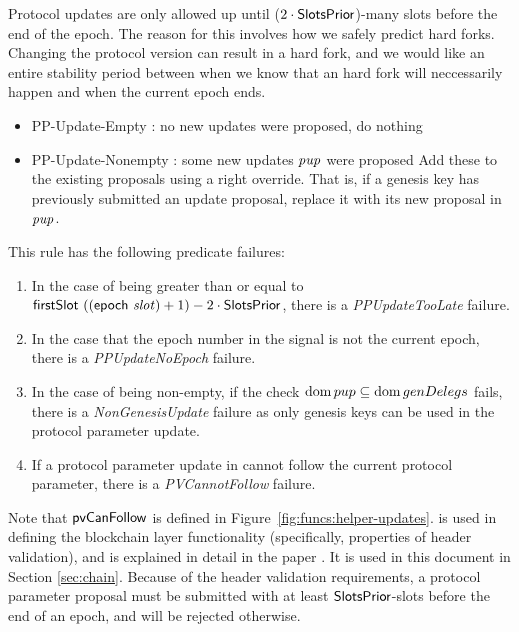 Protocol updates are only allowed up until ($2\cdot\mathsf{SlotsPrior}$)-many slots before the
end of the epoch. The reason for this involves how we safely predict hard forks.
Changing the protocol version can result in a hard fork, and we would like an
entire stability period between when we know that an hard fork will neccessarily happen
and when the current epoch ends.

\begin{itemize}
  \item PP-Update-Empty : no new updates were proposed, do nothing
  \item PP-Update-Nonempty : some new updates $\mathit{pup}$ were proposed
  Add these to
  the existing proposals using a right override. That is, if a genesis key
  has previously submitted an update proposal, replace it with its new
  proposal in $\mathit{pup}$.
\end{itemize}

This rule has the following predicate failures:

\begin{enumerate}
\item In the case of  being greater than or equal to
  $\mathsf{firstSlot}~((\mathsf{epoch}~\mathit{slot}) + 1) - 2\cdot\mathsf{SlotsPrior}$, there is
  a \emph{PPUpdateTooLate} failure.
\item In the case that the epoch number in the signal is not the current epoch,
  there is a \emph{PPUpdateNoEpoch} failure.
\item In the case of  being non-empty, if the check $\operatorname{dom} pup \subseteq
  \operatorname{dom} genDelegs$ fails, there is a \emph{NonGenesisUpdate} failure as only genesis keys
  can be used in the protocol parameter update.
\item If a protocol parameter update in  cannot follow the current
  protocol parameter, there is a \emph{PVCannotFollow} failure.
\end{enumerate}

Note that $\mathsf{pvCanFollow}$
is defined in Figure~\ref{fig:funcs:helper-updates}.
is used in defining the blockchain layer functionality (specifically,
properties of header validation),
and is explained in detail in the paper \cite{byron_chain_spec}.
It is used in this document in
Section \ref{sec:chain}.
Because of the header validation requirements, a protocol parameter proposal
must be submitted with at least $\mathsf{SlotsPrior}$-slots before the end of an epoch,
and will be rejected otherwise.

